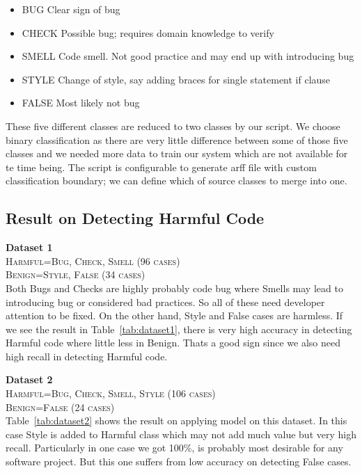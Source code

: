 \documentclass[nocopyrightspace]{sigplanconf}
\begin{document}
\begin{itemize}
\item BUG		Clear sign of bug
\item CHECK	Possible bug; requires domain knowledge to verify
\item SMELL	Code smell. Not good practice and may end up with introducing bug
\item STYLE     	Change of style, say adding braces for single statement if clause
\item FALSE     	Most likely not bug
\end{itemize}

\vspace{10 pt}
\noindent
These five different classes are reduced to two classes by our script. We choose binary classification as there are very little difference between some of those five classes and we needed more data to train our system which are not available for te time being. The script is configurable to generate arff file with custom classification boundary; we can define which of source classes to merge into one.

\subsection{Result on Detecting Harmful Code}
\textbf{Dataset 1}\\
\textsc{Harmful=Bug, Check, Smell (96 cases)}\\
\textsc{Benign=Style, False (34 cases)}\\

\noindent
Both Bugs and Checks are highly probably code bug where Smells may lead to introducing bug or considered bad practices. So all of these need developer attention to be fixed. On the other hand, Style and False cases are harmless. If we see the result in Table~\ref{tab:dataset1}, there is very high accuracy in detecting Harmful code where little less in Benign. Thats a good sign since we also need high recall in detecting Harmful code.

\vspace{10 pt}
\noindent
\textbf{Dataset 2}\\
\textsc{Harmful=Bug, Check, Smell, Style (106 cases)}\\
\textsc{Benign=False (24 cases)}\\

\noindent
Table~\ref{tab:dataset2} shows the result on applying model on this dataset. In this case Style is added to Harmful class which may not add much value but very high recall. Particularly in one case we got 100\%, is probably most desirable for any software project. But this one suffers from low accuracy on detecting False cases.
\end{document}
